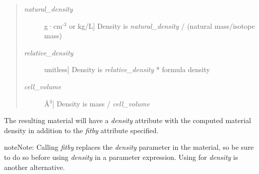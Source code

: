 \documentclass[letterpaper,10pt,english]{sphinxmanual}
\begin{document}
\begin{fulllineitems}
\begin{fulllineitems}
\begin{quote}
\begin{description}
\item[{\emph{natural\_density}}] \leavevmode{[}g·cm$^{\text{-3}}$ or kg/L{]}
Density is \emph{natural\_density} / (natural mass/isotope mass)

\item[{\emph{relative\_density}}] \leavevmode{[}unitless{]}
Density is \emph{relative\_density} * formula density

\item[{\emph{cell\_volume}}] \leavevmode{[}Å$^{\text{3}}${]}
Density is mass / \emph{cell\_volume}

\end{description}
\end{quote}

The resulting material will have a \emph{density} attribute with the
computed material density in addition to the \emph{fitby}
attribute specified.

\begin{notice}{note}{Note:}
Calling \emph{fitby} replaces the \emph{density} parameter in the
material, so be sure to do so before using \emph{density} in
a parameter expression.  Using  for \emph{density}
is another alternative.
\end{notice}

\end{fulllineitems}


\begin{fulllineitems}
\label{api/material:refl1d.material.Material.parameters}
\end{fulllineitems}


\begin{fulllineitems}
\label{api/material:refl1d.material.Material.sld}
\end{fulllineitems}


\end{fulllineitems}

\end{document}
